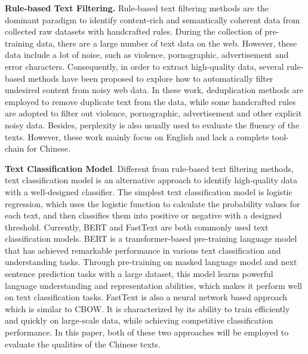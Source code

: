 \documentclass{article}
\begin{document}
\textbf{Rule-based Text Filtering.} Rule-based text filtering methods are the dominant paradigm to identify content-rich and semantically coherent data from collected raw datasets with handcrafted rules. During the collection of pre-training data, there are a large number of text data on the web. However, these data include a lot of noise, such as violence, pornographic, advertisement and error characters. Consequently, in order to extract high-quality data, several rule-based methods have been proposed to explore how to automatically filter undesired content from noisy web data. In these work, deduplication\cite{lee_deduplicating_2022} methods are employed to remove duplicate text from the data, while some handcrafted rules \cite{raffel_exploring_2020,luccioni_whats_2021} are adopted to filter out violence, pornographic, advertisement and other explicit noisy data. Besides, perplexity \cite{wenzek_ccnet_2020} is also usually used to evaluate the fluency of the texts. However, these work mainly focus on English and lack a complete tool-chain for Chinese.

\textbf{Text Classification Model}. Different from rule-based text filtering methods, text classification model is an alternative approach to identify high-quality data with a well-designed classifier. The simplest text classification model is logistic regression\cite{brown2020language}, which uses the logistic function to calculate the probability values for each text, and then classifies them into positive or negative with a designed threshold. Currently, BERT\cite{devlin_bert_2018} and FastText\cite{joulin_bag_2017} are both commonly used text classification models. BERT is a transformer-based\cite{transformer} pre-training language model that has achieved remarkable performance in various text classification and understanding tasks. Through pre-training on masked language model and next sentence prediction tasks with a large dataset, this model learns powerful language understanding and representation abilities, which makes it perform well on text classification tasks. FastText\cite{joulin_bag_2017} is also a neural network based approach which is similar to CBOW\cite{word2vec}. It is characterized by its ability to train efficiently and quickly on large-scale data, while achieving competitive classification performance. In this paper, both of these two approaches will be employed to evaluate the qualities of the Chinese texts.  
\end{document}
